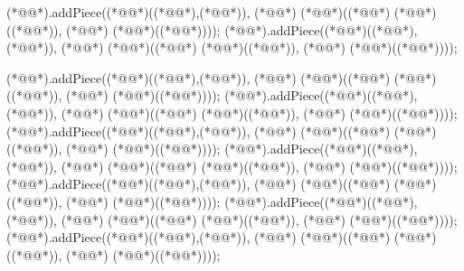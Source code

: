 \begin{vdm_al}
    (*@@*).addPiece((*@@*)((*@@*),(*@@*)), (*@@*) (*@@*)((*@@*) (*@@*)((*@@*)), (*@@*) (*@@*)((*@@*))));
    (*@@*).addPiece((*@@*)((*@@*),(*@@*)), (*@@*) (*@@*)((*@@*) (*@@*)((*@@*)), (*@@*) (*@@*)((*@@*))));
    
    (*@@*).addPiece((*@@*)((*@@*),(*@@*)), (*@@*) (*@@*)((*@@*) (*@@*)((*@@*)), (*@@*) (*@@*)((*@@*))));
    (*@@*).addPiece((*@@*)((*@@*),(*@@*)), (*@@*) (*@@*)((*@@*) (*@@*)((*@@*)), (*@@*) (*@@*)((*@@*))));
    (*@@*).addPiece((*@@*)((*@@*),(*@@*)), (*@@*) (*@@*)((*@@*) (*@@*)((*@@*)), (*@@*) (*@@*)((*@@*))));
    (*@@*).addPiece((*@@*)((*@@*),(*@@*)), (*@@*) (*@@*)((*@@*) (*@@*)((*@@*)), (*@@*) (*@@*)((*@@*))));
    (*@@*).addPiece((*@@*)((*@@*),(*@@*)), (*@@*) (*@@*)((*@@*) (*@@*)((*@@*)), (*@@*) (*@@*)((*@@*))));
    (*@@*).addPiece((*@@*)((*@@*),(*@@*)), (*@@*) (*@@*)((*@@*) (*@@*)((*@@*)), (*@@*) (*@@*)((*@@*))));
    (*@@*).addPiece((*@@*)((*@@*),(*@@*)), (*@@*) (*@@*)((*@@*) (*@@*)((*@@*)), (*@@*) (*@@*)((*@@*))));

\end{vdm_al}
